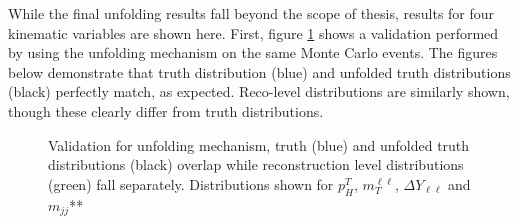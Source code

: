 While the final unfolding results fall beyond the scope of thesis, results for four kinematic variables are shown here. First, figure \ref{fig:unfoldingvalidation} shows a validation performed by using the unfolding mechanism on the same Monte Carlo events. The figures below demonstrate that truth distribution (blue) and unfolded truth distributions (black) perfectly match, as expected. Reco-level distributions are similarly shown, though these clearly differ from truth distributions. 

\begin{figure}[!h]
\centering
\centering
  \hfill
  \hfill
  \hfill
\caption{\label{fig:unfoldingvalidation}Validation for unfolding mechanism, truth (blue) and unfolded truth distributions (black) overlap while reconstruction level distributions (green) fall separately. Distributions shown for $p^T_H$, $m_T^{\ell\ell}$, $\Delta Y_{\ell\ell}$ and $m_{jj}$**}
\end{figure}


